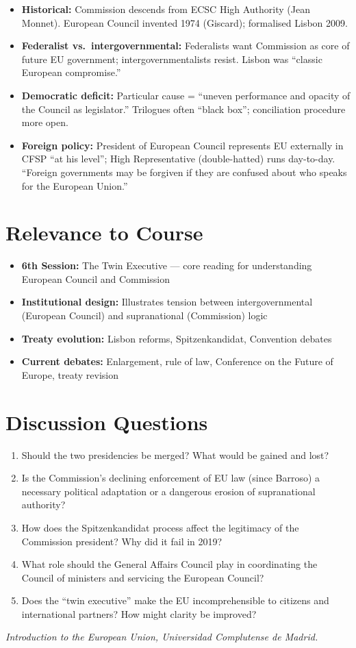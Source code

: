 \documentclass[11pt,a4paper]{article}
\begin{document}
\begin{itemize}
\item \textbf{Historical:} Commission descends from ECSC High Authority (Jean Monnet). European Council invented 1974 (Giscard); formalised Lisbon 2009.
\item \textbf{Federalist vs.\ intergovernmental:} Federalists want Commission as core of future EU government; intergovernmentalists resist. Lisbon was ``classic European compromise.''
\item \textbf{Democratic deficit:} Particular cause = ``uneven performance and opacity of the Council as legislator.'' Trilogues often ``black box''; conciliation procedure more open.
\item \textbf{Foreign policy:} President of European Council represents EU externally in CFSP ``at his level''; High Representative (double-hatted) runs day-to-day. ``Foreign governments may be forgiven if they are confused about who speaks for the European Union.''
\end{itemize}

\section*{Relevance to Course}

\begin{itemize}
\item \textbf{6th Session:} The Twin Executive --- core reading for understanding European Council and Commission
\item \textbf{Institutional design:} Illustrates tension between intergovernmental (European Council) and supranational (Commission) logic
\item \textbf{Treaty evolution:} Lisbon reforms, Spitzenkandidat, Convention debates
\item \textbf{Current debates:} Enlargement, rule of law, Conference on the Future of Europe, treaty revision
\end{itemize}

\section*{Discussion Questions}

\begin{enumerate}
\item Should the two presidencies be merged? What would be gained and lost?
\item Is the Commission's declining enforcement of EU law (since Barroso) a necessary political adaptation or a dangerous erosion of supranational authority?
\item How does the Spitzenkandidat process affect the legitimacy of the Commission president? Why did it fail in 2019?
\item What role should the General Affairs Council play in coordinating the Council of ministers and servicing the European Council?
\item Does the ``twin executive'' make the EU incomprehensible to citizens and international partners? How might clarity be improved?
\end{enumerate}

\vspace{1em}
\noindent\footnotesize\textit{Introduction to the European Union, Universidad Complutense de Madrid.}
\end{document}
